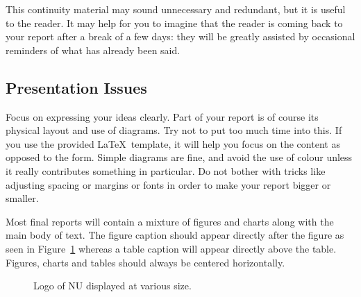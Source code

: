 \documentclass[]{final_report}
\begin{document}
This continuity material may sound unnecessary and redundant, but it is useful to the reader. It may help for you to imagine that the reader is coming back to your report after a break of a few days: they will be greatly assisted by occasional reminders of what has already been said.

\subsection{Presentation Issues}

Focus on expressing your ideas clearly. Part of your report is of course its physical layout and use of diagrams. Try not to put too much time into this. If you use the provided \LaTeX\ template, it will help you focus on the content as opposed to the form. Simple diagrams are fine, and avoid the use of colour unless it really contributes something in particular. Do not bother with tricks like adjusting spacing or margins or fonts in order to make your report bigger or smaller.

Most final reports will contain a mixture of figures and charts along with the main body of text. The figure caption should appear directly after the figure as seen in Figure~\ref{fig:logo} whereas a table caption will appear directly above the table. Figures, charts and tables should always be centered horizontally. 

\begin{figure}[h]
\centering
\fboxsep 2mm
\caption{\label{fig:logo} Logo of NU displayed at various size.}
\end{figure} 
\end{document}
